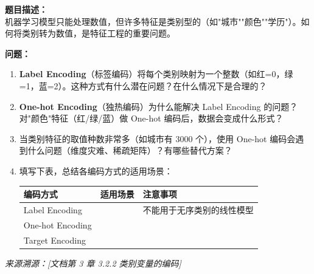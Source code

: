\documentclass[a4paper,11pt]{ctexart}
\begin{document}
\begin{problembox}
    \textbf{题目描述：}\\
    机器学习模型只能处理数值，但许多特征是类别型的（如"城市""颜色""学历"）。如何将类别转为数值，是特征工程的重要问题。

    \vspace{0.2cm}
    \textbf{问题：}
    \begin{enumerate}[(1)]
        \item \textbf{Label Encoding}（标签编码）将每个类别映射为一个整数（如红=0，绿=1，蓝=2）。这种方式有什么潜在问题？在什么情况下是合理的？

        \item \textbf{One-hot Encoding}（独热编码）为什么能解决 Label Encoding 的问题？对"颜色"特征（红/绿/蓝）做 One-hot 编码后，数据会变成什么形式？

        \item 当类别特征的取值种数非常多（如城市有 3000 个），使用 One-hot 编码会遇到什么问题（维度灾难、稀疏矩阵）？有哪些替代方案？

        \item 填写下表，总结各编码方式的适用场景：

        \begin{center}
        \begin{tabular}{p{3cm} p{5cm} p{4.5cm}}
            \toprule
            编码方式 & 适用场景 & 注意事项 \\
            \midrule
            Label Encoding & \underline{\hspace{4.5cm}} & 不能用于无序类别的线性模型 \\[1.2em]
            One-hot Encoding & \underline{\hspace{4.5cm}} & \underline{\hspace{4cm}} \\[1.2em]
            Target Encoding & \underline{\hspace{4.5cm}} & \underline{\hspace{4cm}} \\
            \bottomrule
        \end{tabular}
        \end{center}
    \end{enumerate}
    {\color{gray}\small\textit{来源溯源：[文档第 3 章 3.2.2 类别变量的编码]}}
\end{problembox}
\end{document}
